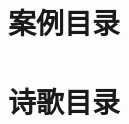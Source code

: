 \documentclass{ctexart}
\begin{document}
\section{案例目录}
\renewcommand*{\listtheoremname}{}
\begin{multicols}{2}
    \listoftheorems[ignoreall, show = case]
\end{multicols}

\section{诗歌目录}
\renewcommand*{\listtheoremname}{}
\begin{multicols}{2}
    \listoftheorems[ignoreall, show = poem]
\end{multicols}
\end{document}
